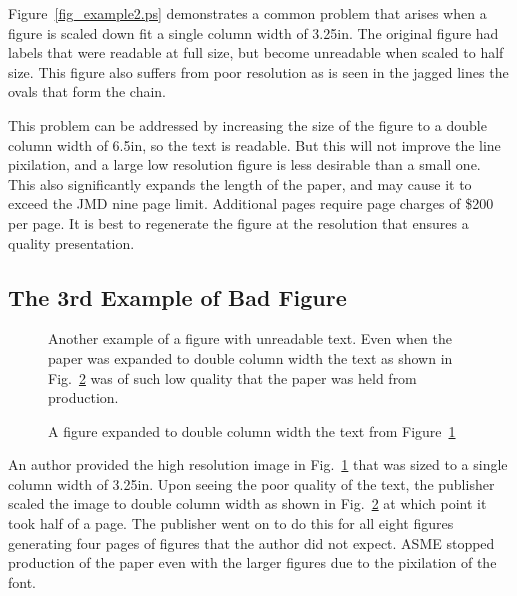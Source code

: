\documentclass[twocolumn,10pt]{asme2ej}
\begin{document}
Figure~\ref{fig_example2.ps}
demonstrates a common problem that arises when a figure is scaled down fit a single column width of 3.25in.  The original figure had labels that were readable at full size, but become unreadable when scaled to half size.  This figure also suffers from poor resolution as is seen in the jagged lines the ovals that form the chain.

This problem can be addressed by increasing the size of the figure to a double column width of 6.5in, so the text is readable.  But this will not improve the line pixilation, and a large low resolution figure is less desirable than a small one.  This also significantly expands the length of the paper, and may cause it to exceed the JMD nine page limit.  Additional pages require page charges of \$200 per page.  It is best to regenerate the figure at the resolution that ensures a quality presentation.


\subsection{The 3rd Example of Bad Figure}
\begin{figure} 
\centerline{}
\caption{Another example of a figure with unreadable text.  Even when the paper was expanded to double column width the text as shown in Fig.~\ref{fig_example4.ps} was of such low quality that the paper was held from production.}
\label{fig_example3.ps}
\end{figure}

\begin{figure} 
\centerline{}
\caption{A figure expanded to double column width the text from Figure~\ref{fig_example3.ps}}
\label{fig_example4.ps}
\end{figure}
An author provided the high resolution image 
in Fig.~\ref{fig_example3.ps}
that was sized to a single column width of 3.25in.  Upon seeing the poor quality of the text, the publisher scaled the image to double column width as shown in Fig.~\ref{fig_example4.ps} 
at which point it took half of a page.  The publisher went on to do this for all eight figures generating four pages of figures that the author did not expect. ASME stopped production of the paper even with the larger figures due to the pixilation of the font.
\end{document}
